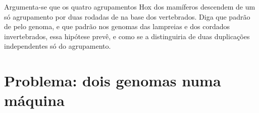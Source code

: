\begin{exercise}[$\star\star\star$]\label{exo:b3:genomics:12}
Argumenta-se que os quatro agrupamentos Hox dos mamíferos descendem de
um só agrupamento por duas rodadas de  na
base dos vertebrados. Diga que padrão de  pelo genoma, e que
padrão nos genomas das lampreias e dos cordados invertebrados, essa
hipótese prevê, e como se a distinguiria de duas duplicações
independentes só do agrupamento.
\end{exercise}

\section{Problema: dois genomas numa máquina}

